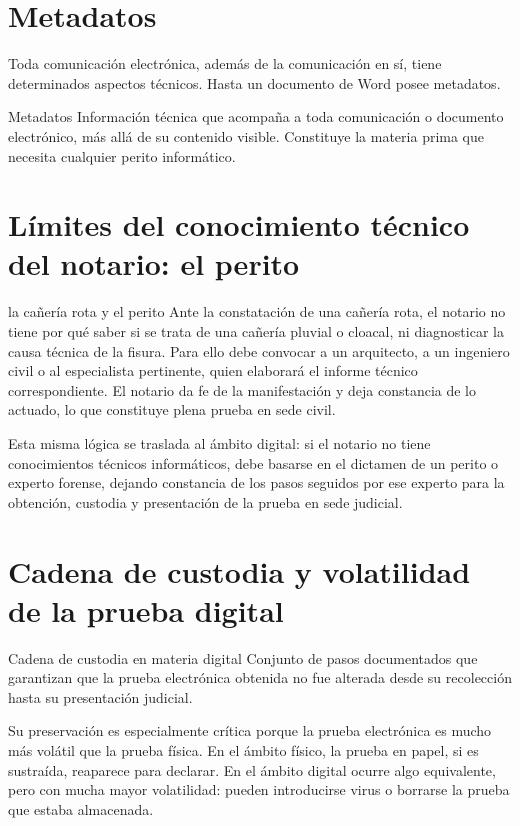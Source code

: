 \documentclass[12pt,oneside]{book}
\begin{document}
\section{Metadatos}

Toda comunicación electrónica, además de la comunicación en sí, tiene determinados aspectos técnicos. Hasta un documento de Word posee metadatos.

\begin{definition}{Metadatos}
Información técnica que acompaña a toda comunicación o documento electrónico, más allá de su contenido visible. Constituye la materia prima que necesita cualquier perito informático.
\end{definition}

\section{Límites del conocimiento técnico del notario: el perito}

\begin{example}{la cañería rota y el perito}
Ante la constatación de una cañería rota, el notario no tiene por qué saber si se trata de una cañería pluvial o cloacal, ni diagnosticar la causa técnica de la fisura. Para ello debe convocar a un arquitecto, a un ingeniero civil o al especialista pertinente, quien elaborará el informe técnico correspondiente. El notario da fe de la manifestación y deja constancia de lo actuado, lo que constituye plena prueba en sede civil.

Esta misma lógica se traslada al ámbito digital: si el notario no tiene conocimientos técnicos informáticos, debe basarse en el dictamen de un perito o experto forense, dejando constancia de los pasos seguidos por ese experto para la obtención, custodia y presentación de la prueba en sede judicial.
\end{example}

\section{Cadena de custodia y volatilidad de la prueba digital}

\begin{definition}{Cadena de custodia en materia digital}
Conjunto de pasos documentados que garantizan que la prueba electrónica obtenida no fue alterada desde su recolección hasta su presentación judicial.
\end{definition}

Su preservación es especialmente crítica porque la prueba electrónica es mucho más volátil que la prueba física. En el ámbito físico, la prueba en papel, si es sustraída, reaparece para declarar. En el ámbito digital ocurre algo equivalente, pero con mucha mayor volatilidad: pueden introducirse virus o borrarse la prueba que estaba almacenada.
\end{document}
